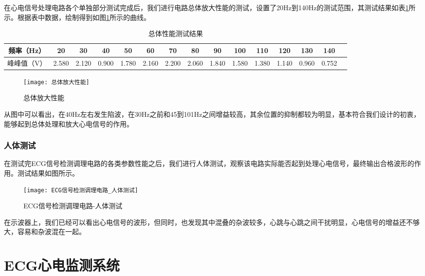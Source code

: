 \documentclass{zjureport}
\begin{document}
	在心电信号处理电路各个单独部分测试完成后，我们进行电路总体放大性能的测试，设置了20Hz到140Hz的测试范围，其测试结果如表\ref{总体性能测试结果}所示。根据表中数据，绘制得到如图\ref{总体放大性能}所示的曲线。
	
	\begin{table}[htbp]
		\centering
		\begin{tabular}{ c|c|c|c|c|c|c|c|c|c|c|c|c|c p{1.5cm}}
			\hline
			频率（Hz） & 20 & 30 & 40 &50 & 60 &70 & 80 &90 & 100 & 110 & 120 &130 & 140 \\
			\hline
			峰峰值（V）  & 2.580 & 2.120 & 0.900 & 1.780 & 2.160 & 2.200 & 2.060 & 1.840 & 1.580 & 1.380 & 1.140 & 0.960 & 0.752 \\
			\hline
		\end{tabular}
		\caption{总体性能测试结果}\label{总体性能测试结果}
	\end{table}

	\begin{figure}[H]
		\centering%
		\texttt{[image: 总体放大性能]}
		\caption{总体放大性能}%
		\label{总体放大性能}%
	\end{figure}

	从图中可以看出，在40Hz左右发生陷波，在30Hz之前和45到101Hz之间增益较高，其余位置的抑制都较为明显，基本符合我们设计的初衷，能够起到总体处理和放大心电信号的作用。
	
	\subsubsection{人体测试}
	
	在测试完ECG信号检测调理电路的各类参数性能之后，我们进行人体测试，观察该电路实际能否起到处理心电信号，最终输出合格波形的作用。测试结果如图所示。
	
	\begin{figure}[H]
		\centering%
		\texttt{[image: ECG信号检测调理电路\_人体测试]}
		\caption{ECG信号检测调理电路-人体测试}%
		\label{ECG信号检测调理电路_人体测试}%
	\end{figure}

	在示波器上，我们已经可以看出心电信号的波形，但同时，也发现其中混叠的杂波较多，心跳与心跳之间干扰明显，心电信号的增益还不够大，容易和杂波混在一起。
	
	\section{ECG心电监测系统}
	
\end{document}
